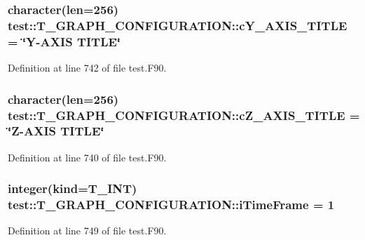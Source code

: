 \hypertarget{typetest_1_1_t___g_r_a_p_h___c_o_n_f_i_g_u_r_a_t_i_o_n_a8619095ac040b17a896ae919c1b195e5}{
\subsubsection[{cY\_\-AXIS\_\-TITLE}]{\setlength{\rightskip}{0pt plus 5cm}character(len=256) {\bf test::T\_\-GRAPH\_\-CONFIGURATION::cY\_\-AXIS\_\-TITLE} = \char`\"{}Y-\/AXIS TITLE\char`\"{}}}
\label{typetest_1_1_t___g_r_a_p_h___c_o_n_f_i_g_u_r_a_t_i_o_n_a8619095ac040b17a896ae919c1b195e5}


Definition at line 742 of file test.F90.

\hypertarget{typetest_1_1_t___g_r_a_p_h___c_o_n_f_i_g_u_r_a_t_i_o_n_a55c100d93411fe8360475d06be02ad38}{
\subsubsection[{cZ\_\-AXIS\_\-TITLE}]{\setlength{\rightskip}{0pt plus 5cm}character(len=256) {\bf test::T\_\-GRAPH\_\-CONFIGURATION::cZ\_\-AXIS\_\-TITLE} = \char`\"{}Z-\/AXIS TITLE\char`\"{}}}
\label{typetest_1_1_t___g_r_a_p_h___c_o_n_f_i_g_u_r_a_t_i_o_n_a55c100d93411fe8360475d06be02ad38}


Definition at line 740 of file test.F90.

\hypertarget{typetest_1_1_t___g_r_a_p_h___c_o_n_f_i_g_u_r_a_t_i_o_n_aca6e857b10a609b51a6519e5aac9e5e0}{
\subsubsection[{iTimeFrame}]{\setlength{\rightskip}{0pt plus 5cm}integer(kind={\bf T\_\-INT}) {\bf test::T\_\-GRAPH\_\-CONFIGURATION::iTimeFrame} = 1}}
\label{typetest_1_1_t___g_r_a_p_h___c_o_n_f_i_g_u_r_a_t_i_o_n_aca6e857b10a609b51a6519e5aac9e5e0}


Definition at line 749 of file test.F90.

